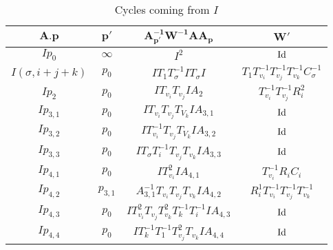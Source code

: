 \documentclass{article}[12pt]
\begin{document}
\begin{table}[h]\label{hurwitztableI}
  \begin{center}
  {\renewcommand{\arraystretch}{1.2}%
\begin{tabular}{|c|c|c|c|}
\hline 
$\mathbf{A.p}$ & $\mathbf{p'}$ & $\mathbf{A_{p'}^{-1}W^{-1}A A_p}$ & $\mathbf{W'}$  \\
\hline

$I p_0$ & $\infty$ & $I^2$ & ${\rm Id}$ \\
\hline

$I (\sigma,i+j+k)$ & $p_0$ & $IT_1T_\sigma ^{-1}IT_\sigma I$ & $T_1T_{v_i}^{-1}T_{v_j}^{-1}T_{v_k}^{-1}C_\sigma ^{-1}$\\
\hline

$I p_2$ & $p_0$ & $IT_{v_i}T_{v_j}IA_2$ & $T_{v_i}^{-1}T_{v_j}^{-1}R_i^2$\\
\hline

$I p_{3,1}$ & $p_0$ & $IT_{v_i}T_{v_j}T_{V_k}IA_{3,1}$ & ${\rm Id}$\\
\hline

$I p_{3,2}$ & $p_0$ & $IT_{v_i}^{-1}T_{v_j}T_{V_k}IA_{3,2}$ & ${\rm Id}$\\
\hline

$I p_{3,3}$ & $p_0$ & $IT_\sigma T_i^{-1}T_{v_j}T_{v_k}IA_{3,3}$ & ${\rm Id}$\\
\hline

$I p_{4,1}$ & $p_0$ & $IT_{v_i}^2IA_{4,1}$ & $T_{v_i}^{-1}R_iC_i$\\
\hline

$I p_{4,2}$ & $p_{3,1}$ & $A_{3,1}^{-1}T_{v_i}T_{v_j}T_{v_k}IA_{4,2}$ & $R_i^1T_{v_i}^{-1}T_{v_j}^{-1}T_{v_k}^{-1}$\\
\hline

$I p_{4,3}$ & $p_0$ & $IT_{v_i}^2T_{v_j}T_{v_k}^2T_k^{-1}T_i^{-1}IA_{4,3}$ & ${\rm Id}$\\
\hline

$I p_{4,4}$ & $p_0$ & $IT_k^{-1}T_1^{-1}T_{v_j}^2T_{v_k}IA_{4,4}$ & ${\rm Id}$\\
\hline





\end{tabular}
}
\end{center}
\caption{Cycles coming from $I$}
\end{table}
\end{document}
